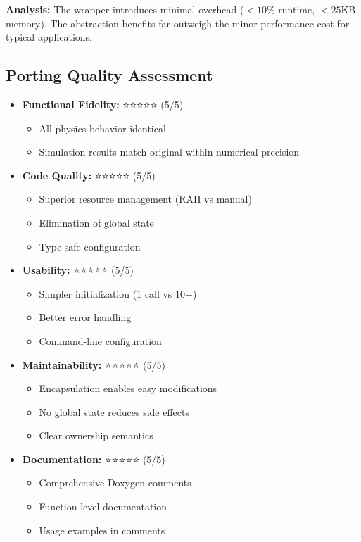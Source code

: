 \textbf{Analysis:} The wrapper introduces minimal overhead ($<10\%$ runtime, $<25$KB memory). The abstraction benefits far outweigh the minor performance cost for typical applications.

\subsection{Porting Quality Assessment}

\begin{itemize}
    \item \textbf{Functional Fidelity:} ⭐⭐⭐⭐⭐ (5/5)
    \begin{itemize}
        \item All physics behavior identical
        \item Simulation results match original within numerical precision
    \end{itemize}

    \item \textbf{Code Quality:} ⭐⭐⭐⭐⭐ (5/5)
    \begin{itemize}
        \item Superior resource management (RAII vs manual)
        \item Elimination of global state
        \item Type-safe configuration
    \end{itemize}

    \item \textbf{Usability:} ⭐⭐⭐⭐⭐ (5/5)
    \begin{itemize}
        \item Simpler initialization (1 call vs 10+)
        \item Better error handling
        \item Command-line configuration
    \end{itemize}

    \item \textbf{Maintainability:} ⭐⭐⭐⭐⭐ (5/5)
    \begin{itemize}
        \item Encapsulation enables easy modifications
        \item No global state reduces side effects
        \item Clear ownership semantics
    \end{itemize}

    \item \textbf{Documentation:} ⭐⭐⭐⭐⭐ (5/5)
    \begin{itemize}
        \item Comprehensive Doxygen comments
        \item Function-level documentation
        \item Usage examples in comments
    \end{itemize}
\end{itemize}


